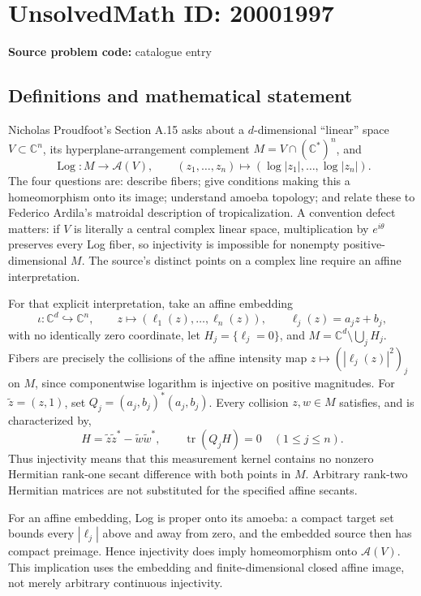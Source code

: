 \documentclass[11pt]{article}
\newcommand{\C}{\mathbb{C}}
\begin{document}
\section*{UnsolvedMath ID: 20001997}
\textbf{Source problem code:} catalogue entry
\subsection{Definitions and mathematical statement}
Nicholas Proudfoot's Section A.15 asks about a \(d\)-dimensional ``linear'' space \(V\subset\C^n\), its hyperplane-arrangement complement \(M=V\cap(\C^*)^n\), and
\[
 \operatorname{Log}:M\to\mathcal A(V),\qquad
 (z_1,\ldots,z_n)\mapsto(\log|z_1|,\ldots,\log|z_n|).
\]
The four questions are: describe fibers; give conditions making this a homeomorphism onto its image; understand amoeba topology; and relate these to Federico Ardila's matroidal description of tropicalization. A convention defect matters: if \(V\) is literally a central complex linear space, multiplication by \(e^{i\theta}\) preserves every Log fiber, so injectivity is impossible for nonempty positive-dimensional \(M\). The source's distinct points on a complex line require an affine interpretation.

For that explicit interpretation, take an affine embedding
\[
 \iota:\C^d\hookrightarrow\C^n,\qquad
 z\mapsto(\ell_1(z),\ldots,\ell_n(z)),\qquad
 \ell_j(z)=a_jz+b_j,
\]
with no identically zero coordinate, let \(H_j=\{\ell_j=0\}\), and \(M=\C^d\setminus\bigcup_jH_j\). Fibers are precisely the collisions of the affine intensity map \(z\mapsto(|\ell_j(z)|^2)_j\) on \(M\), since componentwise logarithm is injective on positive magnitudes. For \(\widetilde z=(z,1)\), set \(Q_j=(a_j,b_j)^*(a_j,b_j)\). Every collision \(z,w\in M\) satisfies, and is characterized by,
\[
 H=\widetilde z\widetilde z^*-\widetilde w\widetilde w^*,\qquad
 \operatorname{tr}(Q_jH)=0\quad(1\leq j\leq n).
\]
Thus injectivity means that this measurement kernel contains no nonzero Hermitian rank-one secant difference with both points in \(M\). Arbitrary rank-two Hermitian matrices are not substituted for the specified affine secants.

For an affine embedding, Log is proper onto its amoeba: a compact target set bounds every \(|\ell_j|\) above and away from zero, and the embedded source then has compact preimage. Hence injectivity does imply homeomorphism onto \(\mathcal A(V)\). This implication uses the embedding and finite-dimensional closed affine image, not merely arbitrary continuous injectivity.
\end{document}

